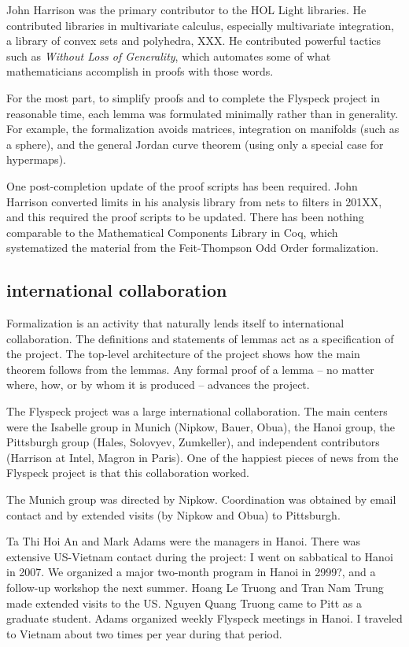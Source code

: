 \documentclass{amsart}
\begin{document}
John Harrison was the primary contributor to the HOL Light libraries.
He contributed libraries in multivariate calculus, especially
multivariate integration, a library of convex sets and polyhedra, XXX.
He contributed powerful tactics such as \emph{Without Loss of
  Generality}, which automates some of what mathematicians accomplish
in proofs with those words.

For the most part, to simplify proofs and to complete the Flyspeck
project in reasonable time, each lemma was formulated minimally rather
than in generality.  For example, the formalization avoids matrices,
integration on manifolds (such as a sphere), and the general Jordan
curve theorem (using only a special case for hypermaps).

One post-completion update of the proof scripts has been required.
John Harrison converted limits in his analysis library from nets to
filters in 201XX, and this required the proof scripts to be updated.
There has been nothing comparable to the Mathematical Components
Library in Coq, which systematized the material from the Feit-Thompson
Odd Order formalization.

\subsection{international collaboration}

Formalization is an activity that naturally lends itself to
international collaboration.  The definitions and statements of lemmas
act as a specification of the project.  The top-level architecture of
the project shows how the main theorem follows from the lemmas.  Any
formal proof of a lemma -- no matter where, how, or by whom it is
produced -- advances the project.  


The Flyspeck project was a large international collaboration.  The
main centers were the Isabelle group in Munich (Nipkow, Bauer, Obua),
the Hanoi group, the Pittsburgh group (Hales, Solovyev, Zumkeller),
and independent contributors (Harrison at Intel, Magron in Paris).
One of the happiest pieces of news from the Flyspeck project is that
this collaboration worked.

The Munich group was directed by Nipkow.  Coordination was obtained by
email contact and by extended visits (by Nipkow and Obua) to
Pittsburgh.

Ta Thi Hoi An and Mark Adams were the managers in Hanoi.  There was
extensive US-Vietnam contact during the project: I went on sabbatical
to Hanoi in 2007.  We organized a major two-month program in Hanoi in
2999?, and a follow-up workshop the next summer.  Hoang Le Truong and
Tran Nam Trung made extended visits to the US.  Nguyen Quang Truong
came to Pitt as a graduate student.  Adams organized weekly Flyspeck
meetings in Hanoi.  I traveled to Vietnam about two times per year
during that period.
\end{document}
